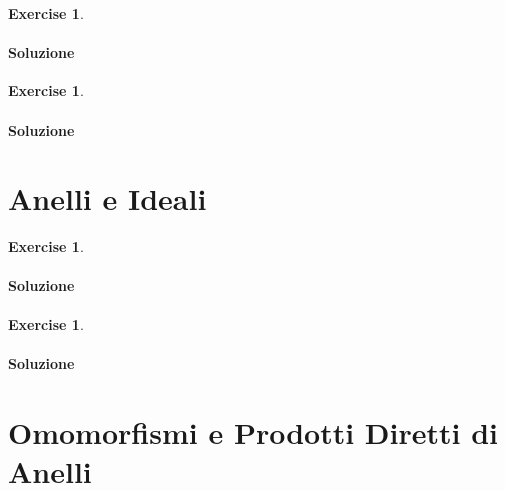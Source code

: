 \documentclass{article}
\theoremstyle{plain}
\theoremstyle{definition}
\newtheorem{xca}[exmp]{Exercise}
\theoremstyle{remark}
\begin{document}
\vspace{10pt}

\begin{bxthm}
\begin{xca}

\end{xca}
\end{bxthm}
\paragraph{Soluzione}

\vspace{10pt}

\begin{bxthm}
\begin{xca}

\end{xca}
\end{bxthm}
\paragraph{Soluzione}

\newpage
\section{Anelli e Ideali}
\vspace{20pt}

\vspace{10pt}

\begin{bxthm}
\begin{xca}

\end{xca}
\end{bxthm}
\paragraph{Soluzione}

\vspace{10pt}

\begin{bxthm}
\begin{xca}

\end{xca}
\end{bxthm}
\paragraph{Soluzione}

\newpage
\section{Omomorfismi e Prodotti Diretti di Anelli}
\vspace{20pt}
\end{document}
